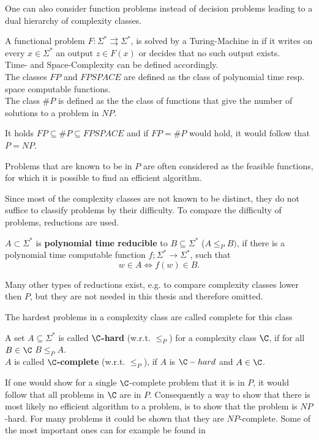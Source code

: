 		One can also consider function problems instead of decision problems
    leading to a dual hierarchy of complexity classes.
		\begin{definition}
      A functional problem $F: \Sigma^* \rightrightarrows \Sigma^*$, is solved
      by a Turing-Machine in if it writes on every $x \in \Sigma^*$ an output
      $z \in F(x)$ or decides that no such output exists.  \\ Time- and
      Space-Complexity can be defined accordingly. \\ The classes $FP$ and
      $FPSPACE$ are defined as the class of polynomial time resp. space
      computable functions. \\ The class $\#P$ is defined as the the class of
      functions that give the number of solutions to a problem in $NP$.
    \end{definition}
		It holds $FP \subseteq \#P \subseteq FPSPACE$ and if $FP = \#P$ would hold, it would follow that $P = NP$.
     
		Problems that are known to be in $P$ are often considered as the feasible functions, 
		for which it is possible to find an efficient algorithm. 

    Since most of the complexity classes are not known to be distinct, they do
    not suffice to classify problems by their difficulty.
    To compare the difficulty of problems, reductions are used.
		\begin{definition}
			$A \subset \Sigma^*$ is \textbf{polynomial time reducible} to $B \subseteq \Sigma^*$ ($A \leq_P B)$, 
			if there is a polynomial time computable function $f; \Sigma^* \to \Sigma^*$, such that
			$$ w \in A \Leftrightarrow f(w) \in B.$$
		\end{definition}
		Many other types of reductions exist, e.g. to compare complexity classes
    lower then $P$, but they are not needed in this thesis and therefore
    omitted.

		The hardest problems in a complexity class are called complete for this class
		\begin{definition}
			A set $A \subseteq \Sigma^*$ is called \textbf{$\C$-hard} (w.r.t. $\leq_P$) for a complexity class $\C$, if for all $B \in \C$ $B \leq_P A$. \\
			$A$ is called \textbf{$\C$-complete} (w.r.t. $\leq_P$), if $A$ is $\C-hard$ and $A \in \C$.  
		\end{definition}
		If one would show for a single $\C$-complete problem that it is in $P$, it would follow that all problems in $\C$ are in $P$.
		Consequently a way to show that there is most likely no efficient algorithm to a problem, is to show that the problem is $NP$-hard.
    For many problems it could be shown that they are $NP$-complete. 
    Some of the most important ones can for example be found in
    \cite{bookwithnpcompleteproblems}
